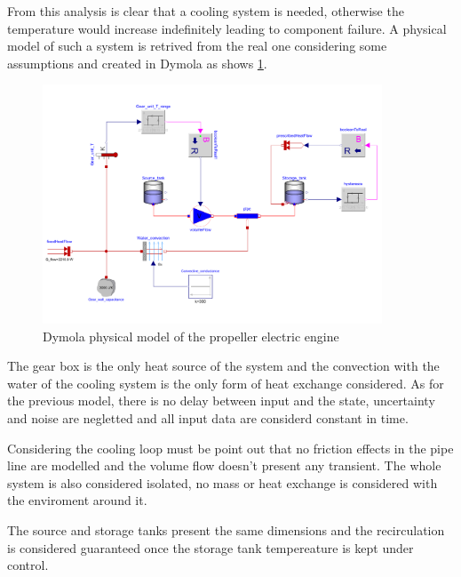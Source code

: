 \documentclass[11pt,a4paper,oneside]{article}
\begin{document}
From this analysis is clear that a cooling system is needed, otherwise the temperature would increase indefinitely leading to component failure.
A physical model of such a system is retrived from the real one considering some assumptions and created in Dymola as shows \cref{fig:ex2b_coolingModel}.
\begin{figure}[H]
    \centering
    \includegraphics*[width=0.9\textwidth, keepaspectratio]{Figures/ex2b_blockDiag.pdf}
    \caption[]{\label{fig:ex2b_coolingModel} Dymola physical model of the propeller electric engine}
\end{figure}

The gear box is the only heat source of the system and the convection with the water of the cooling system is the only form of heat exchange considered. 
As for the previous model, there is no delay between input and the state, uncertainty and noise are negletted and all input data are considerd constant in time. 

Considering the cooling loop must be point out that no friction effects in the pipe line are modelled and the volume flow doesn't present any transient.
The whole system is also considered isolated, no mass or heat exchange is considered with the enviroment around it.

The source and storage tanks present the same dimensions and the recirculation is considered guaranteed once the storage tank tempereature is kept under control.
\end{document}
